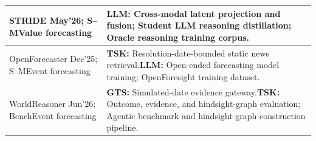 \documentclass[preprints,article,submit,moreauthors]{Definitions/mdpi}
\newcommand{\typeSMshort}{\textsf{S--M}}
\newcommand{\typeBenchshort}{\textsf{Bench}}
\newcommand{\selfclaim}{\textsuperscript{\dag}}
\begin{document}
\begin{longtable}{@{}>{\raggedright\arraybackslash}p{}p{}@{}}
STRIDE \citep{stride2026}\selfclaim{} May'26; \typeSMshort{}\newline Value forecasting & \textbf{LLM:} Cross-modal latent projection and fusion; Student LLM reasoning distillation; Oracle reasoning training corpus.\\\midrule
OpenForecaster \citep{openforecaster2026} Dec'25; \typeSMshort{}\newline Event forecasting & \textbf{TSK:} Resolution-date-bounded static news retrieval.\newline\textbf{LLM:} Open-ended forecasting model training; OpenForesight training dataset.\\\midrule
WorldReasoner \citep{worldreasoner2026} Jun'26; \typeBenchshort{}\newline Event forecasting & \textbf{GTS:} Simulated-date evidence gateway.\newline\textbf{TSK:} Outcome, evidence, and hindsight-graph evaluation; Agentic benchmark and hindsight-graph construction pipeline.\\\midrule
\end{longtable}

\endgroup
\end{document}
